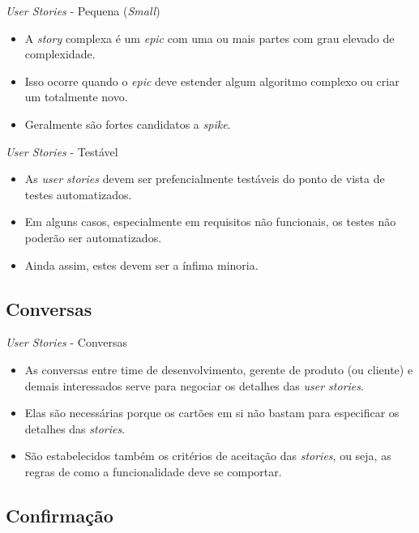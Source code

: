 \documentclass[11pt]{beamer}
\begin{document}
   \begin{frame}{\textit{User Stories} - Pequena (\textit{Small})}
      \begin{itemize}
         \item A \textit{story} complexa é um \textit{epic} com uma ou mais partes com grau elevado de complexidade.
         \item Isso ocorre quando o \textit{epic} deve estender algum algoritmo complexo ou criar um totalmente novo.
         \item Geralmente são fortes candidatos a \textit{spike}.
      \end{itemize}
   \end{frame}

   \begin{frame}{\textit{User Stories} - Testável}
      \begin{itemize}
         \item As \textit{user stories} devem ser prefencialmente testáveis do ponto de vista de testes automatizados.
         \item Em alguns casos, especialmente em requisitos não funcionais, os testes não poderão ser automatizados.
         \item Ainda assim, estes devem ser a ínfima minoria.
      \end{itemize}
   \end{frame}

   \subsection{Conversas}

   \begin{frame}{\textit{User Stories} - Conversas}
      \begin{itemize}
         \item As conversas entre time de desenvolvimento, gerente de produto (ou cliente) e demais interessados serve para negociar os detalhes das \textit{user stories}.
         \item Elas são necessárias porque os cartões em si não bastam para especificar os detalhes das \textit{stories}.
         \item São estabelecidos também os critérios de aceitação das \textit{stories}, ou seja, as regras de como a funcionalidade deve se comportar.
      \end{itemize}
   \end{frame}

   \subsection{Confirmação}
\end{document}

